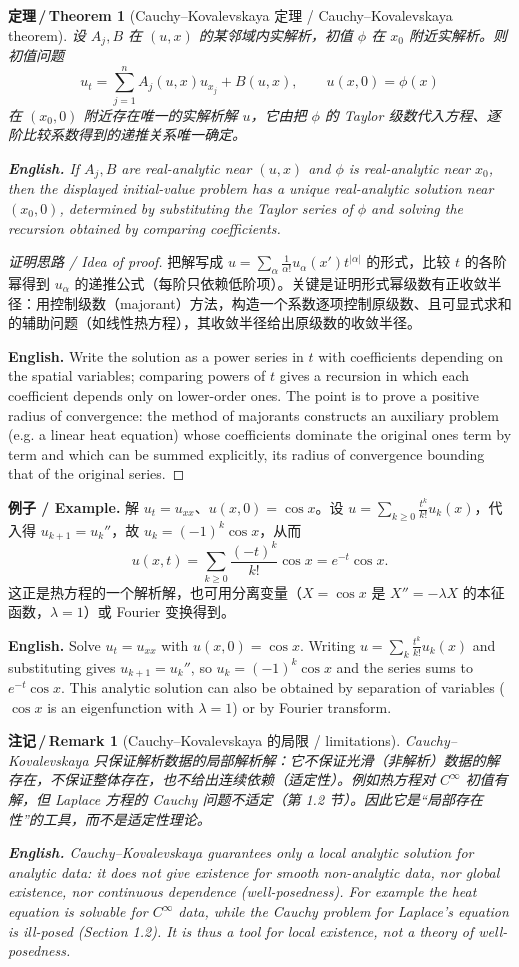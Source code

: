 \documentclass[UTF8,11pt,a4paper]{ctexart}
\newcommand{\EN}[1]{\par\noindent \textbf{English.} #1\par}
\newcommand{\EX}[2]{\par\noindent \textbf{例子 / Example.} #1\par\EN{#2}}
\newtheorem{theorem}[definition]{定理\,/\,Theorem}
\newtheorem{remark}[definition]{注记\,/\,Remark}
\begin{document}
\begin{theorem}[Cauchy--Kovalevskaya 定理 / Cauchy--Kovalevskaya theorem]\label{thm:ck}
设 $A_j,B$ 在 $(u,x)$ 的某邻域内实解析，初值 $\phi$ 在 $x_0$ 附近实解析。则初值问题
\[
u_t=\sum_{j=1}^{n}A_j(u,x)u_{x_j}+B(u,x),\qquad u(x,0)=\phi(x)
\]
在 $(x_0,0)$ 附近存在唯一的实解析解 $u$，它由把 $\phi$ 的 Taylor 级数代入方程、逐阶比较系数得到的递推关系唯一确定。
\EN{If $A_j,B$ are real-analytic near $(u,x)$ and $\phi$ is real-analytic near $x_0$, then the displayed initial-value problem has a unique real-analytic solution near $(x_0,0)$, determined by substituting the Taylor series of $\phi$ and solving the recursion obtained by comparing coefficients.}
\end{theorem}

\begin{proof}[证明思路 / Idea of proof]
把解写成 $u=\sum_{\alpha}\frac{1}{\alpha!}u_\alpha(x')t^{|\alpha|}$ 的形式，比较 $t$ 的各阶幂得到 $u_\alpha$ 的递推公式（每阶只依赖低阶项）。关键是证明形式幂级数有正收敛半径：用控制级数（majorant）方法，构造一个系数逐项控制原级数、且可显式求和的辅助问题（如线性热方程），其收敛半径给出原级数的收敛半径。\EN{Write the solution as a power series in $t$ with coefficients depending on the spatial variables; comparing powers of $t$ gives a recursion in which each coefficient depends only on lower-order ones. The point is to prove a positive radius of convergence: the method of majorants constructs an auxiliary problem (e.g. a linear heat equation) whose coefficients dominate the original ones term by term and which can be summed explicitly, its radius of convergence bounding that of the original series.}
\end{proof}

\EX{解 $u_t=u_{xx}$、$u(x,0)=\cos x$。设 $u=\sum_{k\ge0}\frac{t^k}{k!}u_k(x)$，代入得 $u_{k+1}=u_k''$，故 $u_k=(-1)^k\cos x$，从而
\[
u(x,t)=\sum_{k\ge0}\frac{(-t)^k}{k!}\cos x=e^{-t}\cos x .
\]
这正是热方程的一个解析解，也可用分离变量（$X=\cos x$ 是 $X''=-\lambda X$ 的本征函数，$\lambda=1$）或 Fourier 变换得到。}{Solve $u_t=u_{xx}$ with $u(x,0)=\cos x$. Writing $u=\sum_k\frac{t^k}{k!}u_k(x)$ and substituting gives $u_{k+1}=u_k''$, so $u_k=(-1)^k\cos x$ and the series sums to $e^{-t}\cos x$. This analytic solution can also be obtained by separation of variables ($\cos x$ is an eigenfunction with $\lambda=1$) or by Fourier transform.}

\begin{remark}[Cauchy--Kovalevskaya 的局限 / limitations]
Cauchy--Kovalevskaya 只保证解析数据的局部解析解：它不保证光滑（非解析）数据的解存在，不保证整体存在，也不给出连续依赖（适定性）。例如热方程对 $C^\infty$ 初值有解，但 Laplace 方程的 Cauchy 问题不适定（第 1.2 节）。因此它是``局部存在性''的工具，而不是适定性理论。\EN{Cauchy--Kovalevskaya guarantees only a local analytic solution for analytic data: it does not give existence for smooth non-analytic data, nor global existence, nor continuous dependence (well-posedness). For example the heat equation is solvable for $C^\infty$ data, while the Cauchy problem for Laplace's equation is ill-posed (Section 1.2). It is thus a tool for local existence, not a theory of well-posedness.}
\end{remark}
\end{document}

